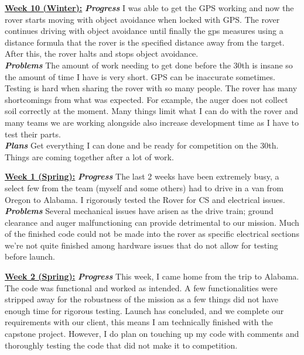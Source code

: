 \documentclass[onecolumn, draftclsnofoot, 10pt, compsoc]{IEEEtran}
\begin{document}
\underline{\textbf{Week 10 (Winter):}}
\newline\textbf{\textit{{Progress}}}
\newline I was able to get the GPS working and now the rover starts moving with object avoidance when locked with GPS. The rover continues driving with object avoidance until finally the gps measures using a distance formula that the rover is the specified distance away from the target. After this, the rover halts and stops object avoidance. \\
\newline\textbf{\textit{{Problems}}}
\newline The amount of work needing to get done before the 30th is insane so the amount of time I have is very short. GPS can be inaccurate sometimes. Testing is hard when sharing the rover with so many people. The rover has many shortcomings from what was expected. For example, the auger does not collect soil correctly at the moment. Many things limit what I can do with the rover and many teams we are working alongside also increase development time as I have to test their parts. \\
\newline\textbf{\textit{{Plans}}}
\newline Get everything I can done and be ready for competition on the 30th. Things are coming together after a lot of work. \newline

\underline{\textbf{Week 1 (Spring):}}
\newline\textbf{\textit{{Progress}}}
\newline The last 2 weeks have been extremely busy, a select few from the team (myself and some others) had to drive in a van from Oregon to Alabama. I rigorously tested the Rover for CS and electrical issues. \\

\textbf{\textit{{Problems}}}
\newline Several mechanical issues have arisen as the drive train; ground clearance and auger malfunctioning can provide detrimental to our mission. Much of the finished code could not be made into the rover as specific electrical sections we're not quite finished among hardware issues that do not allow for testing before launch. \newline 

\underline{\textbf{Week 2 (Spring):}}
\newline\textbf{\textit{{Progress}}}
\newline This week, I came home from the trip to Alabama. The code was functional and worked as intended. A few functionalities were stripped away for the robustness of the mission as a few things did not have enough time for rigorous testing. Launch has concluded, and we complete our requirements with our client, this means I am technically finished with the capstone project. However, I do plan on touching up my code with comments and thoroughly testing the code that did not make it to competition. \\
\end{document}
